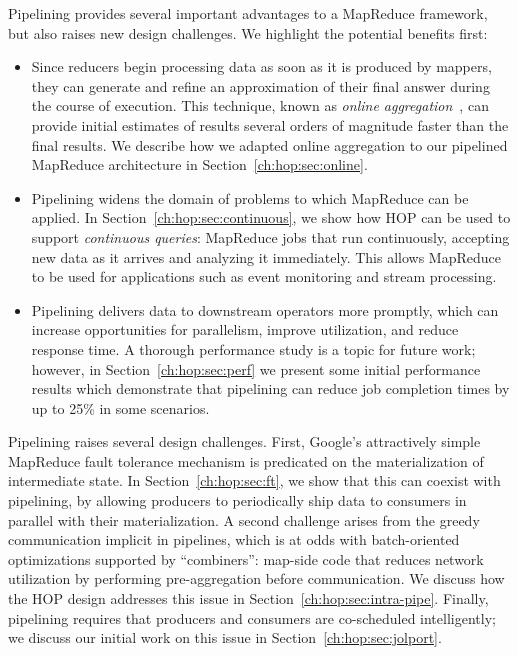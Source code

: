 Pipelining provides several important advantages to a MapReduce
framework, but also raises new design challenges. We highlight the
potential benefits first:
\begin{itemize}
\item
  Since reducers begin processing data as soon as it is produced by mappers,
  they can generate and refine an approximation of their final answer during the
  course of execution. This technique, known as \emph{online
    aggregation}~\cite{onlineagg}, can provide initial estimates of results
  several orders of magnitude faster than the final results.  We
  describe how we adapted online aggregation to our pipelined MapReduce
  architecture in Section~\ref{ch:hop:sec:online}.

\item
  Pipelining widens the domain of problems to which MapReduce can be applied. In
  Section~\ref{ch:hop:sec:continuous}, we show how HOP can be used to support
  \emph{continuous queries}: MapReduce jobs that run continuously, accepting new
  data as it arrives and analyzing it immediately. This allows MapReduce to be
  used for applications such as event monitoring and stream processing.

\item
  Pipelining delivers data to downstream operators more promptly, which can
  increase opportunities for parallelism, improve utilization, and reduce
  response time. A thorough performance study is a topic for future work;
  however, in Section~\ref{ch:hop:sec:perf} we present some initial performance
  results which demonstrate that pipelining can reduce job completion times by
  up to 25\% in some scenarios.
\end{itemize}

Pipelining raises several design challenges. First, Google's attractively simple
MapReduce fault tolerance mechanism is predicated on the materialization of
intermediate state. In Section~\ref{ch:hop:sec:ft}, we show that this can coexist with
pipelining, by allowing producers to periodically ship data to consumers in
parallel with their materialization.  A second challenge arises from the greedy
communication implicit in pipelines, which is at odds with batch-oriented
optimizations supported by ``combiners'': map-side code that reduces network
utilization by performing pre-aggregation before
communication. We discuss how the HOP design addresses this issue in
Section~\ref{ch:hop:sec:intra-pipe}.  Finally, pipelining requires that producers and
consumers are co-scheduled intelligently; we discuss our initial work on this
issue in Section~\ref{ch:hop:sec:jolport}.

